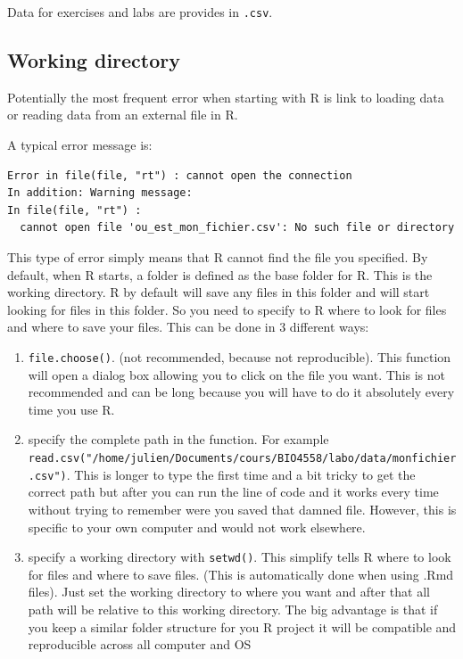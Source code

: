 \documentclass[
  12pt,
]{book}
\makeatletter
\providecommand{\tightlist}{%
  \setlength{\itemsep}{0pt}\setlength{\parskip}{0pt}}
\newenvironment{kframe}{%
\medskip{}
\setlength{\fboxsep}{.8em}
\def\at@end@of@kframe{}%
\ifinner\ifhmode%
 \def\at@end@of@kframe{\end{minipage}}%
 \begin{minipage}{\columnwidth}%
\fi\fi%
\def\FrameCommand##1{\hskip\@totalleftmargin \hskip-\fboxsep
\colorbox{incolor}{##1}\hskip-\fboxsep
    \hskip-\linewidth \hskip-\@totalleftmargin \hskip\columnwidth}%
\MakeFramed {\advance\hsize-\width
  \@totalleftmargin\z@ \linewidth\hsize
  \@setminipage}}%
{\par\unskip\endMakeFramed%
\at@end@of@kframe}
\newenvironment{rmdblock}[1]
 {
 \begin{itemize}
 \renewcommand{\labelitemi}{
   \raisebox{-.7\height}[0pt][0pt]{
     {\setkeys{Gin}{width=3em,keepaspectratio}\texttt{[image: images/\#1]}}
   }
 }
 \begin{kframe}
 \setlength{\fboxsep}{1em}
 \item
 }
 {
 \end{kframe}
 \end{itemize}
 }
\newenvironment{rmdwarning}
  {\begin{rmdblock}{warning}}
  {\end{rmdblock}}
\makeatother
\begin{document}
Data for exercises and labs are provides in \texttt{.csv}.

\hypertarget{working-directory}{%
\subsection{Working directory}\label{working-directory}}

\begin{rmdwarning}
Potentially the most frequent error when starting with R is link to loading data or reading data from an external file in R.
\end{rmdwarning}

A typical error message is:

\begin{verbatim}
Error in file(file, "rt") : cannot open the connection
In addition: Warning message:
In file(file, "rt") :
  cannot open file 'ou_est_mon_fichier.csv': No such file or directory
\end{verbatim}

This type of error simply means that R cannot find the file you specified. By default, when R starts, a folder is defined as the base folder for R. This is the working directory. R by default will save any files in this folder and will start looking for files in this folder. So you need to specify to R where to look for files and where to save your files. This can be done in 3 different ways:

\begin{enumerate}
\def\labelenumi{\arabic{enumi}.}
\tightlist
\item
  \texttt{file.choose()}. (not recommended, because not reproducible). This function will open a dialog box allowing you to click on the file you want. This is not recommended and can be long because you will have to do it absolutely every time you use R.
\item
  specify the complete path in the function. For example \texttt{read.csv("/home/julien/Documents/cours/BIO4558/labo/data/monfichier.csv")}. This is longer to type the first time and a bit tricky to get the correct path but after you can run the line of code and it works every time without trying to remember were you saved that damned file. However, this is specific to your own computer and would not work elsewhere.
\item
  specify a working directory with \texttt{setwd()}. This simplify tells R where to look for files and where to save files. (This is automatically done when using .Rmd files). Just set the working directory to where you want and after that all path will be relative to this working directory. The big advantage is that if you keep a similar folder structure for you R project it will be compatible and reproducible across all computer and OS
\end{enumerate}
\end{document}
